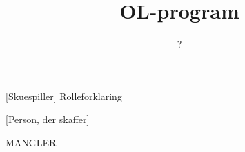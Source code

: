 \documentclass[a4paper,11pt]{article}
\title{OL-program}
\author{?}
\begin{document}
\maketitle

\begin{roles}
[Skuespiller] Rolleforklaring
\end{roles}

\begin{props}
[Person, der skaffer]
\end{props}


\begin{sketch}

MANGLER

\end{sketch}
\end{document}
